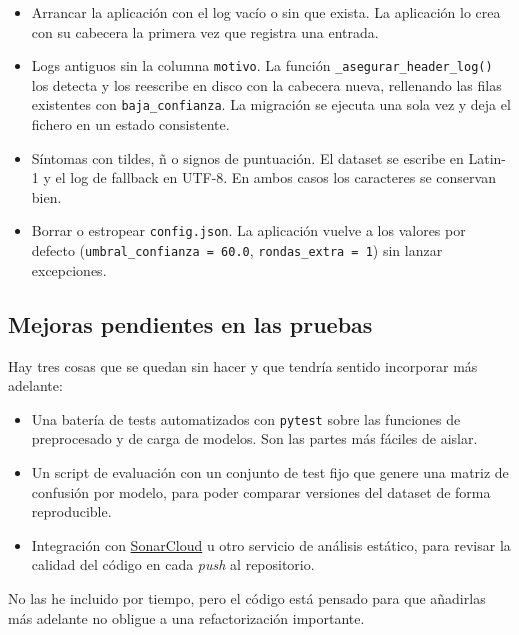 \begin{itemize}
	\item Arrancar la aplicación con el log vacío o sin que exista. La aplicación lo crea con su cabecera la primera vez que registra una entrada.
	\item Logs antiguos sin la columna \texttt{motivo}. La función \texttt{\_asegurar\_header\_log()} los detecta y los reescribe en disco con la cabecera nueva, rellenando las filas existentes con \texttt{baja\_confianza}. La migración se ejecuta una sola vez y deja el fichero en un estado consistente.
	\item Síntomas con tildes, ñ o signos de puntuación. El dataset se escribe en Latin-1 y el log de fallback en UTF-8. En ambos casos los caracteres se conservan bien.
	\item Borrar o estropear \texttt{config.json}. La aplicación vuelve a los valores por defecto (\texttt{umbral\_confianza = 60.0}, \texttt{rondas\_extra = 1}) sin lanzar excepciones.
\end{itemize}

\subsection{Mejoras pendientes en las pruebas}

Hay tres cosas que se quedan sin hacer y que tendría sentido incorporar más adelante:

\begin{itemize}
	\item Una batería de tests automatizados con \texttt{pytest} sobre las funciones de preprocesado y de carga de modelos. Son las partes más fáciles de aislar.
	\item Un script de evaluación con un conjunto de test fijo que genere una matriz de confusión por modelo, para poder comparar versiones del dataset de forma reproducible.
	\item Integración con \href{https://sonarcloud.io/}{SonarCloud} u otro servicio de análisis estático, para revisar la calidad del código en cada \textit{push} al repositorio.
\end{itemize}

No las he incluido por tiempo, pero el código está pensado para que añadirlas más adelante no obligue a una refactorización importante.